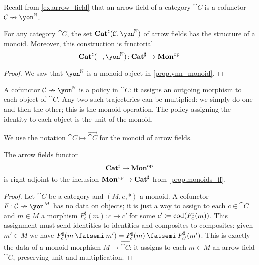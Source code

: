\documentclass[Book-Poly]{subfiles}
\begin{document}
Recall from \cref{ex.arrow_field} that an arrow field of a category $\cat{C}$ is a cofunctor $\cat{C}\cof\yon^\nn$.

\begin{corollary}
For any category $\cat{C}$, the set $\smcat^\sharp(\cat{C},\yon^\nn)$ of arrow fields has the structure of a monoid. Moreover, this construction is functorial
\[\smcat^\sharp(-,\yon^\nn)\colon\smcat^\sharp\to\Cat{Mon}\op\]
\end{corollary}
\begin{proof}
We saw that $\yon^\nn$ is a monoid object in \cref{prop.ynn_monoid}.
\end{proof}

A cofunctor $\cat{C}\cof\yon^\nn$ is a policy in $\cat{C}$: it assigns an outgoing morphism to each object of $\cat{C}$. Any two such trajectories can be multiplied: we simply do one and then the other; this is the monoid operation. The policy assigning the identity to each object is the unit of the monoid.

We use the notation $\cat{C}\mapsto\vec{\cat{C}}$ for the monoid of arrow fields.

\begin{theorem}\label{thm.catsharp_to_mon}
The arrow fields functor
\[\mathbf{Cat}^\sharp\to\mathbf{Mon}^{\textnormal{op}}\]
is right adjoint to the inclusion $\mathbf{Mon}^{\textnormal{op}}\to\mathbf{Cat}^\sharp$ from \cref{prop.monoids_ff}.
\end{theorem}
\begin{proof}
Let $\cat{C}$ be a category and $(M,e,*)$ a monoid. A cofunctor $F\colon\cat{C}\cof\yon^M$ has no data on objects; it is just a way to assign to each $c\in \cat{C}$ and $m\in M$ a morphism $F^\sharp_c(m)\colon c\to c'$ for some $c'\coloneqq\operatorname{cod}(F^\sharp_c(m))$. This assignment must send identities to identities and composites to composites: given $m'\in M$ we have $F^\sharp_c(m\then m')=F^\sharp_c(m)\then F^\sharp_{c'}(m')$. This is exactly the data of a monoid morphism $M\to \vec{\cat{C}}$: it assigns to each $m\in M$ an arrow field $\cat{C}$, preserving unit and multiplication.
\end{proof}
\end{document}
